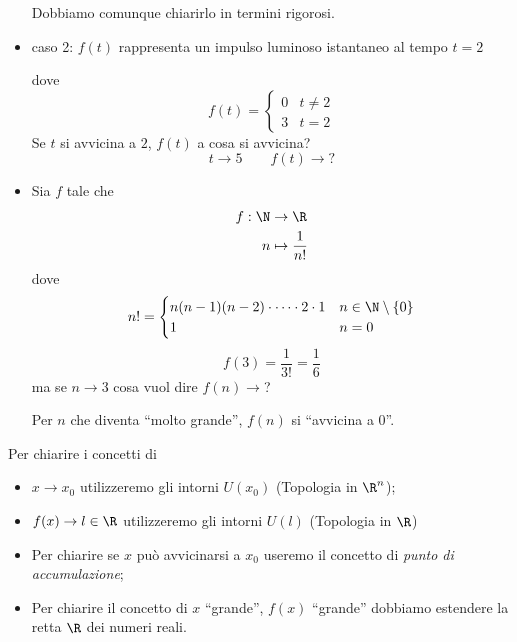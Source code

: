 \begin{itemize}
    Dobbiamo comunque chiarirlo in termini rigorosi.
    \item caso 2: $ f(t)$ rappresenta un impulso luminoso istantaneo al tempo $ t=2 $
    \begin{center}
    \end{center} dove \[
        f(t)=\begin{cases}
            0 & t\neq 2\\
            3 & t=2
        \end{cases}
    \]
    Se $ t $ si avvicina a $ 2 $, $ f(t) $ a cosa si avvicina? \[
        t\to 5 \qquad f(t)\to ?
    \]
    \item Sia $ f $ tale che \begin{align*}
    f: \N & \to \R \\
    n & \mapsto \frac{1}{n!}
    \end{align*} dove \[
        n!=\begin{cases}
            n(n-1)(n-2) \cdot \cdots \cdot 2 \cdot 1 &n \in \N\setminus\{0\}\\
            1 &n =0
        \end{cases}
    \]
    \[
        f(3)=\frac{1}{3!}=\frac{1}{6}
    \] ma se $ n\to 3 $ cosa vuol dire $ f(n)\to $?

    Per $ n $ che diventa ``molto grande'', $ f(n) $ si ``avvicina a 0''.
\end{itemize}
Per chiarire i concetti di \begin{itemize}
    \item $ x\to x_0 $ utilizzeremo gli intorni $ U(x_0) $ (Topologia in $ \R^{n} $);
    \item $ f(x)\to l \in \R $ utilizzeremo gli intorni $ U(l) $ (Topologia in $ \R $)
    \item Per chiarire se $ x $ può avvicinarsi a $ x_0 $ useremo il concetto di \textit{punto di accumulazione};
    \item Per chiarire il concetto di $ x $ ``grande'', $ f(x) $ ``grande'' dobbiamo estendere la retta $ \R $ dei numeri reali.
\end{itemize}

